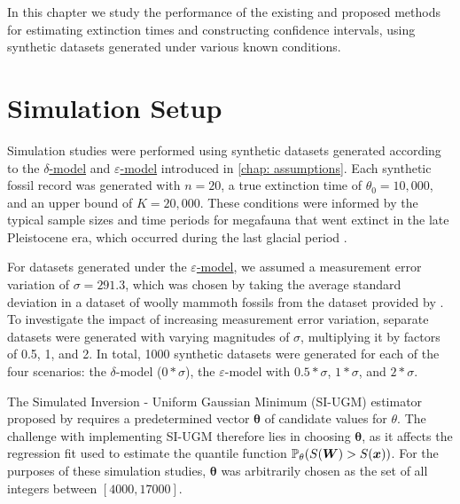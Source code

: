 
In this chapter we study the performance of the existing and proposed methods for estimating extinction times and constructing confidence intervals, using synthetic datasets generated under various known conditions.

\section{Simulation Setup}

Simulation studies were performed using synthetic datasets generated according to the \hyperref[model: no-measurement-error]{$\delta$-model} and \hyperref[model: measurement-error]{$\varepsilon$-model} introduced in \autoref{chap: assumptions}. Each synthetic fossil record was generated with $n=20$, a true extinction time of $\theta_0 = 10,000$, and an upper bound of $K = 20,000$. These conditions were informed by the typical sample sizes and time periods for megafauna that went extinct in the late Pleistocene era, which occurred during the last glacial period \cite{Cooper2015}.

For datasets generated under the \hyperref[model: measurement-error]{$\varepsilon$-model}, we assumed a measurement error variation of $\sigma = 291.3$, which was chosen by taking the average standard deviation in a dataset of woolly mammoth fossils from the dataset provided by \citet{Cooper2015}. To investigate the impact of increasing measurement error variation, separate datasets were generated with varying magnitudes of $\sigma$, multiplying it by factors of 0.5, 1, and 2. In total, 1000 synthetic datasets were generated for each of the four scenarios: the $\delta$-model ($0*\sigma$), the $\varepsilon$-model with $0.5*\sigma$, $1*\sigma$, and $2*\sigma$. 

The Simulated Inversion - Uniform Gaussian Minimum (SI-UGM) estimator proposed by \citet{Huang2019} requires a predetermined vector $\bm{\theta}$ of candidate values for $\theta$. The challenge with implementing SI-UGM therefore lies in choosing $\bm{\theta}$, as it affects the regression fit used to estimate the quantile function $\mathbb{P}_\theta(S(\bm{W}) > S(\bm{x}))$. For the purposes of these simulation studies, $\bm{\theta}$ was arbitrarily chosen as the set of all integers between $[4000, 17000]$.

